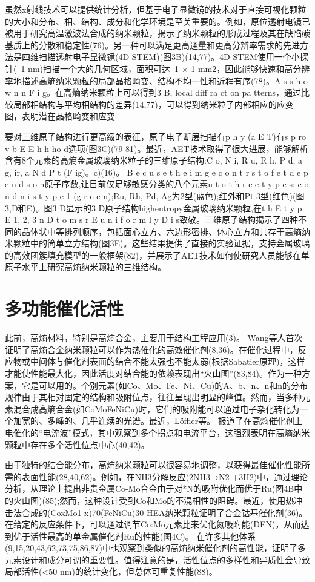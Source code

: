\documentclass[a4paper]{article}
\begin{document}
虽然x射线技术可以提供统计分析，但基于电子显微镜的技术对于直接可视化颗粒的大小和分布、相、结构、成分和化学环境是至关重要的。例如，原位透射电镜已被用于研究高温激波法合成的纳米颗粒，揭示了纳米颗粒的形成过程及其在缺陷碳基质上的分散和稳定性(76)。另一种可以满足更高通量和更高分辨率需求的先进方法是四维扫描透射电子显微镜(4D-STEM)(图3B)(14,77)。4D-STEM使用一个小探针(~1 nm)扫描一个大的几何区域，面积可达~1 × 1 mm2，因此能够快速和高分辨率地描述高熵纳米颗粒的局部晶格畸变、结构不均一性和近程有序(78)。A s s h o w n n F i g。在高熵纳米颗粒上可以得到3 B, local diff ra ct on pa tterns，通过比较局部相结构与平均相结构的差异(14,77)，可以得到纳米粒子内部相应的应变图，表明潜在晶格畸变和应变


要对三维原子结构进行更高级的表征，原子电子断层扫描有p h y (a E T)有s p ro v b E E h h ho d选项(图3C)(79-81)。最近，AET技术取得了很大进展，能够解析含有8个元素的高熵金属玻璃纳米粒子的三维原子结构:C o, N i, R u, R h, P d, a g, ir, a N d P t (F ig)。c)(16)。
B e c u s e t h e i m g e c o n t r s t o f e t d e p e n d s o n原子序数,让目前仅足够敏感分类的八个元素n t o t h r e e t y p e s: c o n d n i s t y p e 1 (g r e e n);Ru, Rh, Pd, Ag为2型(蓝色);红外和Pt 3型(红色)(图3,D和E)。图3 D显示的3 D原子结构highentropy金属玻璃纳米颗粒,在t h E t y p E 1, 2, 3 n D t o m s r E u n i f o r m l y D i s致敬。三维原子结构揭示了四种不同的晶体状中等排列顺序，包括面心立方、六边形密排、体心立方和共存于高熵纳米颗粒中的简单立方结构(图3E)。这些结果提供了直接的实验证据，支持金属玻璃的高效团簇填充模型的一般框架(82)，并展示了AET技术如何使研究人员能够在单原子水平上研究高熵纳米颗粒的三维结构。


\section*{多功能催化活性}
此前，高熵材料，特别是高熵合金，主要用于结构工程应用(3)。
Wang等人首次证明了高熵合金纳米颗粒可以作为热催化的高效催化剂(8,36)。在催化过程中，反应物或中间体与催化剂表面的结合不能太强也不能太弱(根据Sabatier原理)，这样才能使性能最大化，因此活度对结合能的依赖表现出“火山图”(83,84)。作为一种方案，它是可以用的。个别元素(如Co、Mo、Fe、Ni、Cu)的A、b、n、n和n的分布规律由于其相对固定的结构和吸附位点，往往呈现出明显的峰值。然而，当多种元素混合成高熵合金(如CoMoFeNiCu)时，它们的吸附能可以通过电子杂化转化为一个加宽的、多峰的、几乎连续的光谱。最近，Löffler等。
报道了在高熵催化剂上电催化的“电流波”模式，其中观察到多个拐点和电流平台，这强烈表明在高熵纳米颗粒中存在多个活性位点中心(40,42)。



由于独特的结合能分布，高熵纳米颗粒可以很容易地调整，以获得最佳催化性能所需的表面性能(28,40,62)。例如，在NH3分解反应(2NH3→N2 +3H2)中，通过理论分析，从理论上提出非贵金属Co-Mo合金由于对*N的吸附优化而优于Ru(图4B中的火山图)(85);然而，这种设计受到Co和Mo的不混相性的阻碍。最近，使用热冲击法合成的(CoxMo1-x)70(FeNiCu)30 HEA纳米颗粒证明了合金钴基催化剂(36)。
在给定的反应条件下，可以通过调节Co:Mo元素比来优化氮吸附能(DEN)，从而达到优于活性最高的单金属催化剂Ru的性能(图4C)。
在许多其他体系(9,15,20,43,62,73,75,86,87)中也观察到类似的高熵纳米催化剂的高性能，证明了多元素设计和成分可调的重要性。值得注意的是，活性位点的多样性和异质性会导致局部活性(<50 nm)的统计变化，但总体可重复性能(88)。
\end{document}
